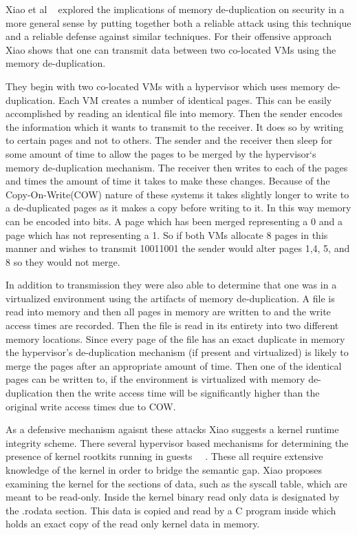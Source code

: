 Xiao et al ~\cite{xiao_security_2013} explored the implications of memory de-duplication on security in a more general sense by putting together both a reliable attack using this technique and a reliable defense against similar techniques. For their offensive approach Xiao shows that one can transmit data between two co-located VMs using the memory de-duplication. 

They begin with two co-located VMs with a hypervisor which uses memory de-duplication. Each VM creates a number of identical pages. This can be easily accomplished by reading an identical file into memory. Then the sender encodes the information which it wants to transmit to the receiver. It does so by writing to certain pages and not to others. The sender and the receiver then sleep for some amount of time to allow the pages to be merged by the hypervisor`s memory de-duplication mechanism. The receiver then writes to each of the pages and times the amount of time it takes to make these changes. Because of the Copy-On-Write(COW) nature of these systems it takes slightly longer to write to a de-duplicated pages as it makes a copy before writing to it. In this way memory can be encoded into bits. A page which has been merged representing a 0 and a page which has not representing a 1. So if both VMs allocate 8 pages in this manner and wishes to transmit 10011001 the sender would alter pages 1,4, 5, and 8 so they would not merge. 

In addition to transmission they were also able to determine that one was in a virtualized environment using the artifacts of memory de-duplication. A file is read into memory and then all pages in memory are written to and the write access times are recorded. Then the file is read in its entirety into two different memory locations. Since every page of the file has an exact duplicate in memory the hypervisor’s de-duplication mechanism (if present and virtualized) is likely to merge the pages after an appropriate amount of time. Then one of the identical pages can be written to, if the environment is virtualized with memory de-duplication then the write access time will be significantly higher than the original write access times due to COW. 



As a defensive mechanism agaisnt these attacks Xiao suggests a kernel runtime integrity scheme.  There several hypervisor based mechanisms for determining the presence of kernel rootkits running in guests ~\cite{butler_windows_2005}~\cite{hoglund_*real*_1999}. These all require extensive knowledge of the kernel in order to bridge the semantic gap. Xiao proposes examining the kernel for the sections of data, such as the syscall table, which are meant to be read-only. Inside the kernel binary read only data is designated by the .rodata section. This data is copied and read by a C program inside which holds an exact copy of the read only kernel data in memory. 

